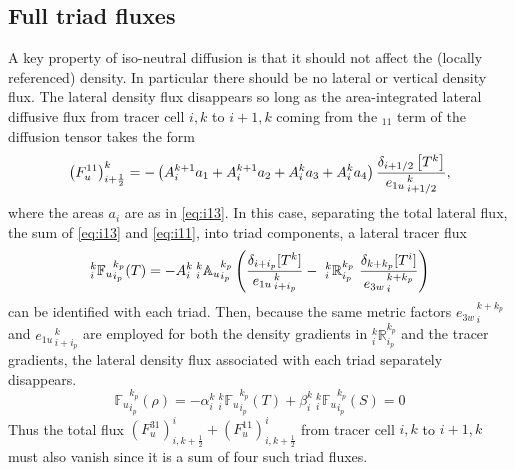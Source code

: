 \documentclass[../tex_main/NEMO_manual]{subfiles}
\begin{document}
\subsection{Full triad fluxes}
A key property of iso-neutral diffusion is that it should not affect the (locally referenced) density.
In particular there should be no lateral or vertical density flux.
The lateral density flux disappears so long as the area-integrated lateral diffusive flux from
tracer cell $i,k$ to $i+1,k$ coming from the $_{11}$ term of the diffusion tensor takes the form
\begin{equation}
  \label{eq:i11}
  \left( F_u^{11} \right) _{i+\frac{1}{2}} ^{k} =
  - \left( {A}_i^{k+1} a_{1} + {A}_i^{k+1} a_{2} + {A}_i^k
    a_{3} + {A}_i^k a_{4} \right)
  \frac{\delta _{i+1/2} \left[ T^k\right]}{{e_{1u}}_{\,i+1/2}^{\,k}},
\end{equation}
where the areas $a_i$ are as in \autoref{eq:i13}.
In this case, separating the total lateral flux, the sum of \autoref{eq:i13} and \autoref{eq:i11},
into triad components, a lateral tracer flux
\begin{equation}
  \label{eq:latflux-triad}
  _i^k {\mathbb{F}_u}_{i_p}^{k_p} (T) = - {A}_i^k{ \:}_i^k{\mathbb{A}_u}_{i_p}^{k_p}
  \left(
    \frac{ \delta_{i+ i_p}[T^k] }{ {e_{1u}}_{\,i + i_p}^{\,k} }
    -\ {_i^k\mathbb{R}_{i_p}^{k_p}} \
    \frac{ \delta_{k+k_p} [T^i] }{{e_{3w}}_{\,i}^{\,k+k_p} }
  \right)
\end{equation}
can be identified with each triad.
Then, because the same metric factors ${e_{3w}}_{\,i}^{\,k+k_p}$ and ${e_{1u}}_{\,i+i_p}^{\,k}$ are employed for both
the density gradients in $ _i^k \mathbb{R}_{i_p}^{k_p}$ and the tracer gradients,
the lateral density flux associated with each triad separately disappears.
\begin{equation}
  \label{eq:latflux-rho}
  {\mathbb{F}_u}_{i_p}^{k_p} (\rho)=-\alpha _i^k {\:}_i^k {\mathbb{F}_u}_{i_p}^{k_p} (T) + \beta_i^k {\:}_i^k {\mathbb{F}_u}_{i_p}^{k_p} (S)=0
\end{equation}
Thus the total flux $\left( F_u^{31} \right) ^i _{i,k+\frac{1}{2}} + \left( F_u^{11} \right) ^i _{i,k+\frac{1}{2}}$ from
tracer cell $i,k$ to $i+1,k$ must also vanish since it is a sum of four such triad fluxes.
\end{document}
